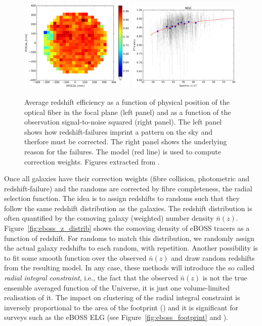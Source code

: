 \begin{figure}
    \centering 
    \includegraphics[width=0.49\textwidth]{fig/galaxies/eboss_z_failures_focalplane.png}
    \includegraphics[width=0.49\textwidth]{fig/galaxies/eboss_z_failures_sn.png}
    \caption{ 
        Average redshift efficiency as a function of physical position of the optical 
        fiber in the focal plane (left panel) and as a function of the observation
        signal-to-noise squared (right panel).  
        The left panel shows how redshift-failures imprint a pattern on the sky 
        and therfore must be corrected. The right panel shows the underlying reason 
        for the failures. The model (red line) is used to compute correction weights.
    Figures extracted from \cite{bautistaSDSSIVExtendedBaryon2018}.} 
    \label{fig:eboss_zfailures}
\end{figure}

Once all galaxies have their correction weights (fibre collision, photometric and 
redshift-failure) and the randoms are corrected by fibre completeness, 
the radial selection function. The idea is to assign redshifts to randoms 
such that they follow the same redshift distribution as the galaxies. 
The redshift distribution is often quantified by the comoving galaxy (weighted)
number density $\bar{n}(z)$. 
Figure~\ref{fig:eboss_z_distrib} shows the comoving density of eBOSS tracers 
as a function of redshift. 
For randoms to match this distribution, we randomly assign the actual galaxy 
redshifts to each random, with repetition. Another possibility is to 
fit some smooth function over the observed $\bar{n}(z)$ and draw random redshifts
from the resulting model. In any case, these methods will introduce the so called 
\emph{radial integral constraint}, i.e., the fact that the observed $\bar{n}(z)$ is 
not the true ensemble averaged function of the Universe, it is just one 
volume-limited realisation of it. The impact on clustering of the radial integral 
constraint is inversely proportional to the area of the footprint
(\cite{demattiaIntegralConstraintsSpectroscopic2019}) and it is significant 
for surveys such as the eBOSS ELG (see Figure~\ref{fig:eboss_footprint} and 
\cite{tamoneCompletedSDSSIVExtended2020, demattiaCompletedSDSSIVExtended2021}). 


